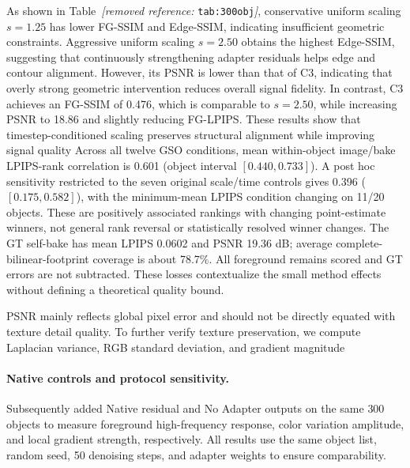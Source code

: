 \documentclass[times,twocolumn,final]{elsarticle}
\providecommand{\DIFadd}[1]{{\protect\color{blue} \sf #1}} %
\providecommand{\DIFdel}[1]{{\protect\color{red} \scriptsize #1}} %
\providecommand{\DIFaddbegin}{} %
\providecommand{\DIFaddend}{} %
\providecommand{\DIFdelbegin}{} %
\providecommand{\DIFdelend}{} %
\begin{document}
\DIFdelbegin \DIFdel{As shown in Table~\textit{[removed reference: }\texttt{tab:300obj}\textit{]}, conservative uniform scaling $s = 1.25$ has lower FG-SSIM and Edge-SSIM, indicating insufficient geometric constraints. Aggressive uniform scaling $s = 2.50$ obtains the highest Edge-SSIM, suggesting that continuously strengthening adapter residuals helps edge and contour alignment. However, its PSNR is lower than that of C3, indicating that overly strong geometric intervention reduces overall signal fidelity. In contrast, C3 achieves an FG-SSIM of 0.476, which is comparable to $s = 2.50$, while increasing PSNR to 18.86 and slightly reducing FG-LPIPS. These results show that timestep-conditioned scaling preserves structural alignment while improving signal quality }\DIFdelend \DIFaddbegin \DIFadd{Across all twelve GSO conditions, mean within-object image/bake LPIPS-rank correlation is 0.601 (object interval $[0.440,0.733]$). A post hoc sensitivity restricted to the seven original scale/time controls gives 0.396 ($[0.175,0.582]$), with the minimum-mean LPIPS condition changing on 11/20 objects. These are positively associated rankings with changing point-estimate winners, not general rank reversal or statistically resolved winner changes. The GT self-bake has mean LPIPS 0.0602 and PSNR 19.36 dB; average complete-bilinear-footprint coverage is about 78.7\%. All foreground remains scored and GT errors are not subtracted. These losses contextualize the small method effects without defining a theoretical quality bound}\DIFaddend .

\DIFdelbegin \DIFdel{PSNR mainly reflects global pixel error and should not be directly equated with texture detail quality. To further verify texture preservation, we compute Laplacian variance, RGB standard deviation, and gradient magnitude }\DIFdelend \DIFaddbegin \paragraph{Native controls and protocol sensitivity.}
\DIFadd{Subsequently added Native residual and No Adapter outputs }\DIFaddend on the same \DIFdelbegin \DIFdel{300 objects to measure foreground high-frequency response, color variation amplitude, and local gradient strength, respectively. All results use the same object list, random seed, 50 denoising steps, and adapter weights to ensure comparability. }%
\end{document}
